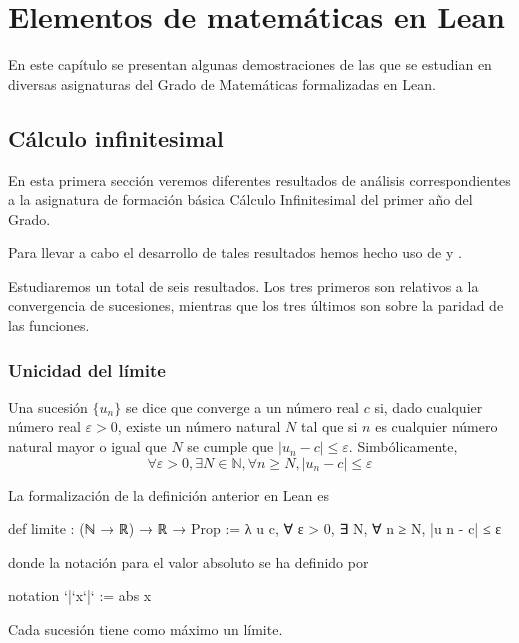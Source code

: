 \chapter{Elementos de matemáticas en Lean}

En este capítulo se presentan algunas demostraciones de las que se
estudian en diversas asignaturas del Grado de Matemáticas formalizadas
en Lean.

\section{Cálculo infinitesimal}

En esta primera sección veremos diferentes resultados de análisis
correspondientes a la asignatura de formación básica Cálculo
Infinitesimal del primer año del Grado.

Para llevar a cabo el desarrollo de tales resultados hemos hecho uso
de \cite{ML} y \cite{LP}.

Estudiaremos un total de seis resultados. Los tres primeros son relativos
a la convergencia de sucesiones, mientras que los tres últimos son sobre
la paridad de las funciones.


\subsection{Unicidad del límite}

\begin{definicion}\label{limite}
  Una sucesión \(\{u_n\}\) se dice que converge a un número real \(c\) si,
  dado cualquier número real \(ε > 0\), existe un número natural \(N\)
  tal que si \(n\) es cualquier número natural mayor o igual que \(N\) se
  cumple que \(|u_n-c| ≤ ε\). Simbólicamente,
  \[∀ ε > 0, ∃ N ∈ ℕ, ∀ n ≥ N, |u_n-c| ≤ ε\]
\end{definicion}

La formalización de la definición anterior en Lean es
\begin{leancode}
def limite : (ℕ → ℝ) → ℝ → Prop :=
λ u c, ∀ ε > 0, ∃ N, ∀ n ≥ N, |u n - c| ≤ ε
\end{leancode}
donde la notación para el valor absoluto se ha definido por
\begin{leancode}
notation `|`x`|` := abs x
\end{leancode}

\begin{teorema}
Cada sucesión tiene como máximo un límite.
\end{teorema}

